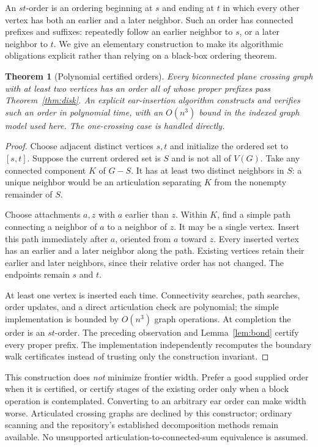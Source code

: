 \documentclass[11pt]{article}
\newtheorem{theorem}{Theorem}[section]
\theoremstyle{definition}\newtheorem{definition}[theorem]{Definition}
\theoremstyle{remark}\newtheorem{remark}[theorem]{Remark}
\begin{document}
An $st$-order is an ordering beginning at $s$ and ending at $t$ in which every
other vertex has both an earlier and a later neighbor. Such an order has connected
prefixes and suffixes: repeatedly follow an earlier neighbor to $s$, or a later
neighbor to $t$. We give an elementary construction to make its algorithmic
obligations explicit rather than relying on a black-box ordering theorem.

\begin{theorem}[Polynomial certified orders]\label{thm:ear}
Every biconnected plane crossing graph with at least two vertices has an order
all of whose proper prefixes pass Theorem~\ref{thm:disk}. An explicit ear-insertion
algorithm constructs and verifies such an order in polynomial time, with an
$O(n^3)$ bound in the indexed graph model used here. The one-crossing case is
handled directly.
\end{theorem}
\begin{proof}
Choose adjacent distinct vertices $s,t$ and initialize the ordered set to
$[s,t]$. Suppose the current ordered set is $S$ and is not all of $V(G)$.
Take any connected component $K$ of $G-S$. It has at least two distinct neighbors
in $S$: a unique neighbor would be an articulation separating $K$ from the
nonempty remainder of $S$.

Choose attachments $a,z$ with $a$ earlier than $z$. Within $K$, find a simple
path connecting a neighbor of $a$ to a neighbor of $z$. It may be a single
vertex. Insert this path immediately after $a$, oriented from $a$ toward $z$.
Every inserted vertex has an earlier and a later neighbor along the path.
Existing vertices retain their earlier and later neighbors, since their
relative order has not changed. The endpoints remain $s$ and $t$.

At least one vertex is inserted each time. Connectivity searches, path searches,
order updates, and a direct articulation check are polynomial; the simple
implementation is bounded by $O(n^3)$ graph operations. At completion the order
is an $st$-order. The preceding observation and Lemma~\ref{lem:bond} certify
every proper prefix. The implementation independently recomputes the boundary
walk certificates instead of trusting only the construction invariant.
\end{proof}

This construction does \emph{not} minimize frontier width. Prefer a good supplied
order when it is certified, or certify stages of the existing order only when a
block operation is contemplated. Converting to an arbitrary ear order can make
width worse. Articulated crossing graphs are declined by this constructor;
ordinary scanning and the repository's established decomposition methods remain
available. No unsupported articulation-to-connected-sum equivalence is assumed.
\end{document}
